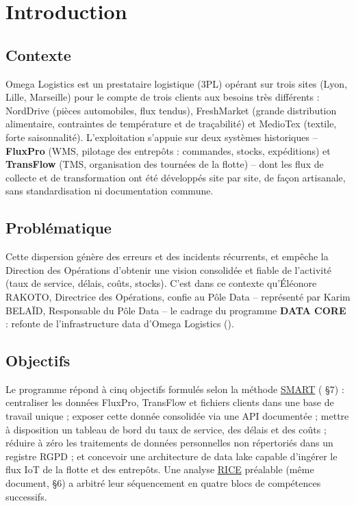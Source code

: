 \chapter{Introduction}
\label{chap:introduction}

\section{Contexte}

Omega Logistics est un prestataire logistique (3PL) opérant sur trois
sites (Lyon, Lille, Marseille) pour le compte de trois clients aux
besoins très différents : NordDrive (pièces automobiles, flux tendus),
FreshMarket (grande distribution alimentaire, contraintes de
température et de traçabilité) et MedioTex (textile, forte
saisonnalité). L'exploitation s'appuie sur deux systèmes historiques --
\textbf{FluxPro} (WMS, pilotage des entrepôts : commandes, stocks,
expéditions) et \textbf{TransFlow} (TMS, organisation des tournées de
la flotte) -- dont les flux de collecte et de transformation ont été
développés site par site, de façon artisanale, sans standardisation ni
documentation commune.

\section{Problématique}

Cette dispersion génère des erreurs et des incidents récurrents, et
empêche la Direction des Opérations d'obtenir une vision consolidée et
fiable de l'activité (taux de service, délais, coûts, stocks). C'est
dans ce contexte qu'Éléonore RAKOTO, Directrice des Opérations,
confie au Pôle Data -- représenté par Karim BELAÏD, Responsable du
Pôle Data -- le cadrage du programme \textbf{DATA CORE} : refonte de
l'infrastructure data d'Omega Logistics
().

\section{Objectifs}

Le programme répond à cinq objectifs formulés selon la méthode
\hyperref[gloss:smart]{SMART} (
§7) : centraliser les données FluxPro, TransFlow et fichiers clients
dans une base de travail unique ; exposer cette donnée consolidée via
une API documentée ; mettre à disposition un tableau de bord du taux
de service, des délais et des coûts ; réduire à zéro les traitements
de données personnelles non répertoriés dans un registre RGPD ; et
concevoir une architecture de data lake capable d'ingérer le flux IoT
de la flotte et des entrepôts. Une analyse \hyperref[gloss:rice]{RICE}
préalable (même document, §6) a arbitré leur séquencement en quatre
blocs de compétences successifs.

